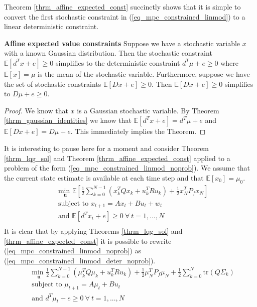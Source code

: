 Theorem \ref{thrm_affine_expected_const} succinctly shows that it is simple to convert the first stochastic constraint in (\ref{eq_mpc_constrained_linmod}) to a linear deterministic constraint.
\begin{thrm}
\textbf{Affine expected value constraints} Suppose we have a stochastic variable $x$ with a known Gaussian distribution. Then the stochastic constraint $\mathbb{E}[d^Tx + e] \geq 0$ simplifies to the deterministic constraint $d^T\mu + e \geq 0$ where $\mathbb{E}[x]= \mu$ is the mean of the stochastic variable. Furthermore, suppose we have the set of stochastic constraints $\mathbb{E}[Dx + e] \geq 0$. Then $\mathbb{E}[Dx + e] \geq 0$ simplifies to $D\mu + e \geq 0$.  
\label{thrm_affine_expected_const}
\end{thrm}
\begin{proof}
We know that $x$ is a Gaussian stochastic variable. By Theorem \ref{thrm_gaussian_identities} we know that $\mathbb{E}[d^Tx + e] =d^T\mu + e$ and $\mathbb{E}[Dx + e] = D\mu + e$. This immediately implies the Theorem.
\end{proof}
It is interesting to pause here for a moment and consider Theorem \ref{thrm_lqg_sol} and Theorem \ref{thrm_affine_expected_const} applied to a problem of the form (\ref{eq_mpc_constrained_linmod_noprob}). We assume that the current state estimate is available at each time step and that $\mathbb{E}[x_0]=\mu_0$.
\begin{equation}
\begin{aligned}
&\underset{\mathbf{u}}{\text{min }} \mathbb{E}\left[ \frac{1}{2}\sum_{k=0}^{N-1} \left( x_k^TQx_k + u_k^TRu_k \right) + \frac{1}{2}x_N^TP_fx_N \right] \\
& \text{subject to } x_{t+1}=Ax_t+Bu_t + w_t \\
& \text{and } \mathbb{E}[d^Tx_t + e] \geq 0 ~\forall ~t=1,...,N \\
\end{aligned}
\label{eq_mpc_constrained_linmod_noprob}
\end{equation}
It is clear that by applying Theorems \ref{thrm_lqg_sol} and \ref{thrm_affine_expected_const} it is possible to rewrite (\ref{eq_mpc_constrained_linmod_noprob}) as (\ref{eq_mpc_constrained_linmod_deter_noprob}).
\begin{equation}
\begin{aligned}
&\underset{\mathbf{u}}{\text{min }} \frac{1}{2}\sum_{k=0}^{N-1} \left( \mu_k^TQ\mu_k + u_k^TRu_k \right) + \frac{1}{2}\mu_N^TP_f\mu_N + \frac{1}{2}\sum_{k=0}^N \text{tr}(Q\Sigma_k) \\
& \text{subject to } \mu_{t+1}=A\mu_t + Bu_t \\
& \text{and } d^T\mu_t + e \geq 0 ~\forall ~t=1,...,N\\
\end{aligned}
\label{eq_mpc_constrained_linmod_deter_noprob}
\end{equation}

